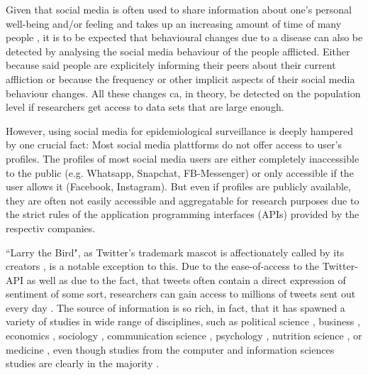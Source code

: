\documentclass[11pt, a4paper,twoside]{report}\usepackage[]{graphicx}\usepackage[]{color}
\begin{document}
Given that social media is often used to share information about one's personal well-being and/or feeling and takes up an increasing amount of time of many people \citep{bauer_timeonline_2016,scott_time_2017,asano_socialmediatime_2017}, it is to be expected that behavioural changes due to a disease can also be detected by analysing the social media behaviour of the people afflicted. Either because said people are explicitely informing their peers about their current affliction or because the frequency or other implicit aspects of their social media behaviour changes. All these changes ca, in theory, be detected on the population level if researchers get access to data sets that are large enough.

However, using social media for epidemiological surveillance is deeply hampered by one crucial fact: Most social media plattforms do not offer access to user's profiles. The profiles of most social media users are either completely inaccessible to the public (e.g. Whatsapp, Snapchat, FB-Messenger) or only accessible if the user allows it (Facebook, Instagram). But even if profiles are publicly available, they are often not easily accessible and aggregatable for research purposes due to the strict rules of the application programming interfaces (APIs) provided by the respectiv companies.

``Larry the Bird", as Twitter's trademark mascot is affectionately called by its creators \citep{rehak_twitterbird_2014}, is a notable exception to this. Due to the ease-of-access to the Twitter-API as well as due to the fact, that tweets often contain a direct expression of sentiment of some sort, researchers can gain access to millions of tweets sent out every day \citep{twitter_annual_2017}. The source of information is so rich, in fact, that it has spawned a variety of studies in wide range of disciplines, such as political science \citep{tumasjan2010predicting,tumasjan2011election,stieglitz2012political,newman2016tracking}, business \citep{swani2014should,chae2015insights}, economics \citep{bollen2011twitter,bollen2011modeling,zhang2012predicting,sul2014trading}, sociology \citep{poblete2011all,himelboim2013birds,mccormick2015using}, communication science \citep{zhao2009and,marwick2011tweet,himelboim2013birds,hermida2013journalism}, psychology \citep{chen2011tweet,golbeck2011predicting,qiu2012you,eichstaedt2015psychological,braithwaite2016validating}, nutrition science \citep{widener2014using,vidal2015using, abbar2015you}, or medicine \citep{salathe2013dynamics,love2013twitter,nwosu2014social,adrover2015identifying,eichstaedt2015psychological,mowery2017feature}, even though studies from the computer and information sciences studies are clearly in the majority \citep{lee2013real,zimmer2014topology,steiger2015advanced}. 
\end{document}
